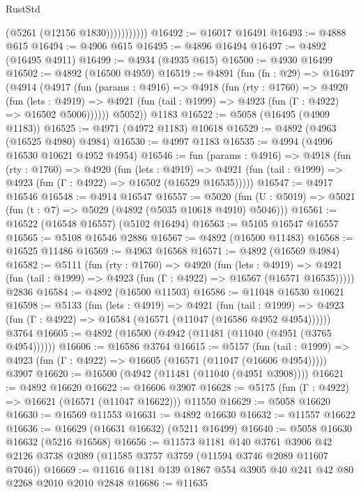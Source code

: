 \begin{lexlean}{RustStd}
\begin{coremodule}
                      (@5261 (@12156 @1830)))))))))))
@16492 := @16017 @16491
@16493 := @4888 @615
@16494 := @4906 @615
@16495 := @4896 @16494
@16497 := @4892 (@16495 @4911)
@16499 := @4934 (@4935 @615)
@16500 := @4930 @16499
@16502 := @4892 (@16500 @4959)
@16519 := @4891
    (fun (fn : @29) =>
    @16497
      (@4914
        (@4917
          (fun (params : @4916) =>
          @4918
            (fun (rty : @1760) =>
            @4920
              (fun (lets : @4919) =>
              @4921 (fun (tail : @1999) => @4923 (fun (Γ : @4922) => @16502 @5006))))))
        @5052))
    @1183
@16522 := @5058 (@16495 (@4909 @1183))
@16525 := @4971 (@4972 @1183) @10618
@16529 := @4892 (@4963 (@16525 @4980) @4984)
@16530 := @4997 @1183
@16535 := @4994 (@4996 @16530 @10621 @4952 @4954)
@16546 := fun (params : @4916) =>
  @4918
    (fun (rty : @1760) =>
    @4920
      (fun (lets : @4919) =>
      @4921 (fun (tail : @1999) => @4923 (fun (Γ : @4922) => @16502 (@16529 @16535)))))
@16547 := @4917 @16546
@16548 := @4914 @16547
@16557 := @5020
    (fun (U : @5019) => @5021 (fun (t : @7) => @5029 (@4892 (@5035 @10618 @4910) @5046)))
@16561 := @16522 (@16548 @16557) (@5102 @16494)
@16563 := @5105 @16547 @16557
@16565 := @5108 @16546 @2886
@16567 := @4892 (@16500 @11483)
@16568 := @16525 @11486
@16569 := @4963 @16568
@16571 := @4892 (@16569 @4984)
@16582 := @5111
    (fun (rty : @1760) =>
    @4920
      (fun (lets : @4919) =>
      @4921 (fun (tail : @1999) => @4923 (fun (Γ : @4922) => @16567 (@16571 @16535)))))
    @2836
@16584 := @4892 (@16500 @11503)
@16586 := @11048 @16530 @10621
@16598 := @5133
    (fun (lets : @4919) =>
    @4921
      (fun (tail : @1999) =>
      @4923 (fun (Γ : @4922) => @16584 (@16571 (@11047 (@16586 @4952 @4954))))))
    @3764
@16605 := @4892 (@16500 (@4942 (@11481 (@11040 (@4951 (@3765 @4954))))))
@16606 := @16586 @3764
@16615 := @5157
    (fun (tail : @1999) => @4923 (fun (Γ : @4922) => @16605 (@16571 (@11047 (@16606 @4954)))))
    @3907
@16620 := @16500 (@4942 (@11481 (@11040 (@4951 @3908))))
@16621 := @4892 @16620
@16622 := @16606 @3907
@16628 := @5175 (fun (Γ : @4922) => @16621 (@16571 (@11047 @16622))) @11550
@16629 := @5058 @16620
@16630 := @16569 @11553
@16631 := @4892 @16630
@16632 := @11557 @16622
@16636 := @16629 (@16631 @16632) (@5211 @16499)
@16640 := @5058 @16630 @16632 (@5216 @16568)
@16656 := @11573
    @1181
    @140
    @3761
    @3906
    @42
    @2126
    @3738
    @2089
    (@11585 @3757 @3759 (@11594 @3746 @2089 @11607 @7046))
@16669 := @11616 @1181 @139 @1867 @554 @3905 @40 @241 @42 @80 @2268 @2010 @2010 @2848
@16686 := @11635

\end{coremodule}
\end{lexlean}

